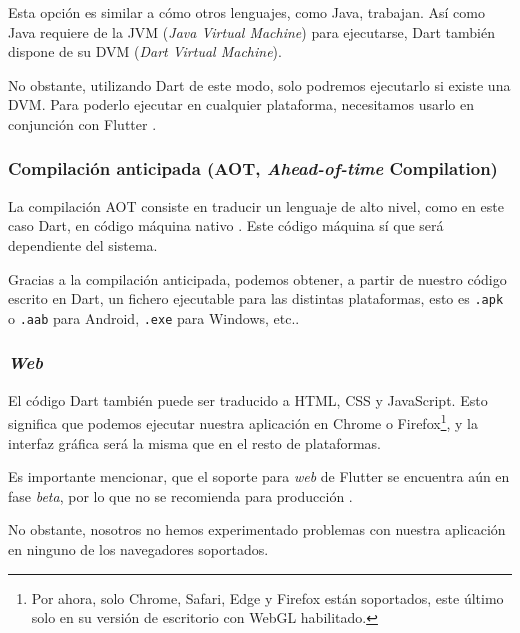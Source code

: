 Esta opción es similar a cómo otros lenguajes, como Java, trabajan. Así como Java requiere de la JVM (\emph{Java Virtual Machine}) para ejecutarse, Dart también dispone de su DVM (\emph{Dart Virtual Machine}).

No obstante, utilizando Dart de este modo, solo podremos ejecutarlo si existe una DVM. Para poderlo ejecutar en cualquier plataforma, necesitamos usarlo en conjunción con Flutter \cite{miola20}.


\subsubsection{Compilación anticipada (AOT, \emph{Ahead-of-time} Compilation)}

La compilación AOT consiste en traducir un lenguaje de alto nivel, como en este caso Dart, en código máquina nativo \cite{aot-wiki}. Este código máquina sí que será dependiente del sistema.

Gracias a la compilación anticipada, podemos obtener, a partir de nuestro código escrito en Dart, un fichero ejecutable para las distintas plataformas, esto es \texttt{.apk} o \texttt{.aab} para Android, \texttt{.exe} para Windows, etc..


\subsubsection{\emph{Web}}

El código Dart también puede ser traducido a HTML, CSS y JavaScript. Esto significa que podemos ejecutar nuestra aplicación en Chrome o Firefox\footnote{Por ahora, solo Chrome, Safari, Edge y Firefox están soportados, este último solo en su versión de escritorio con WebGL habilitado.}, y la interfaz gráfica será la misma que en el resto de plataformas.

Es importante mencionar, que el soporte para \emph{web} de Flutter se encuentra aún en fase \emph{beta}, por lo que no se recomienda para producción \cite{flutter-web}.

No obstante, nosotros no hemos experimentado problemas con nuestra aplicación en ninguno de los navegadores soportados.